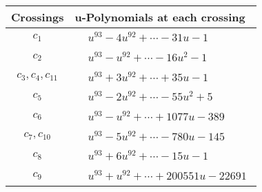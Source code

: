\documentclass[1p]{elsarticle_modified}
\theoremstyle{definition}
\begin{document}
\begin{tabular}{m{50pt}|m{274pt}}
Crossings & \hspace{64pt}u-Polynomials at each crossing \\
\hline $$\begin{aligned}c_{1}\end{aligned}$$&$\begin{aligned}
&u^{93}-4 u^{92}+\cdots-31 u-1
\end{aligned}$\\
\hline $$\begin{aligned}c_{2}\end{aligned}$$&$\begin{aligned}
&u^{93}- u^{92}+\cdots-16 u^2-1
\end{aligned}$\\
\hline $$\begin{aligned}c_{3},c_{4},c_{11}\end{aligned}$$&$\begin{aligned}
&u^{93}+3 u^{92}+\cdots+35 u-1
\end{aligned}$\\
\hline $$\begin{aligned}c_{5}\end{aligned}$$&$\begin{aligned}
&u^{93}-2 u^{92}+\cdots-55 u^2+5
\end{aligned}$\\
\hline $$\begin{aligned}c_{6}\end{aligned}$$&$\begin{aligned}
&u^{93}- u^{92}+\cdots+1077 u-389
\end{aligned}$\\
\hline $$\begin{aligned}c_{7},c_{10}\end{aligned}$$&$\begin{aligned}
&u^{93}-5 u^{92}+\cdots-780 u-145
\end{aligned}$\\
\hline $$\begin{aligned}c_{8}\end{aligned}$$&$\begin{aligned}
&u^{93}+6 u^{92}+\cdots-15 u-1
\end{aligned}$\\
\hline $$\begin{aligned}c_{9}\end{aligned}$$&$\begin{aligned}
&u^{93}+u^{92}+\cdots+200551 u-22691
\end{aligned}$\\
\hline
\end{tabular}\\~\\
\end{document}
